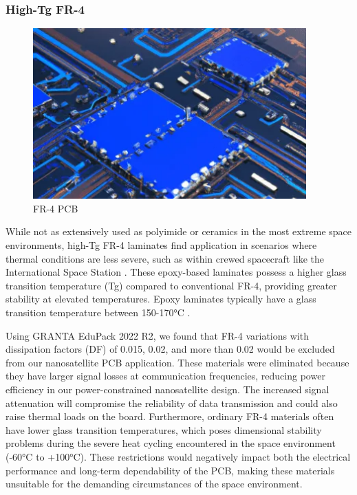 \subsubsection{High-Tg FR-4}
\begin{figure}[htbp]
    \centering
    \includegraphics[width=10.5cm]{chapters/methodology/MaterialAnalysis/Fig1FRPCB.png}
    \caption{FR-4 PCB \cite{RefWorks:86pcb2024fr-4}}
    \label{fig:fr4-pcb}
\end{figure}

While not as extensively used as polyimide or ceramics in the most extreme space environments, high-Tg FR-4 laminates find application in scenarios where thermal conditions are less severe, such as within crewed spacecraft like the International Space Station \cite{RefWorks:2025applying}. 
These epoxy-based laminates possess a higher glass transition temperature (Tg) compared to conventional FR-4, providing greater stability at elevated temperatures.
Epoxy laminates typically have a glass transition temperature between 150-170°C \cite{RefWorks:2025applying}.

Using GRANTA EduPack 2022 R2, we found that FR-4 variations with dissipation factors (DF) of 0.015, 0.02, and more than 0.02 would be excluded from our nanosatellite PCB application. 
These materials were eliminated because they have larger signal losses at communication frequencies, reducing power efficiency in our power-constrained nanosatellite design.
The increased signal attenuation will compromise the reliability of data transmission and could also raise thermal loads on the board. Furthermore, ordinary FR-4 materials often have lower glass transition temperatures, which poses dimensional stability problems during the severe heat cycling encountered in the space environment (-60°C to +100°C). 
These restrictions would negatively impact both the electrical performance and long-term dependability of the PCB, making these materials unsuitable for the demanding circumstances of the space environment.


